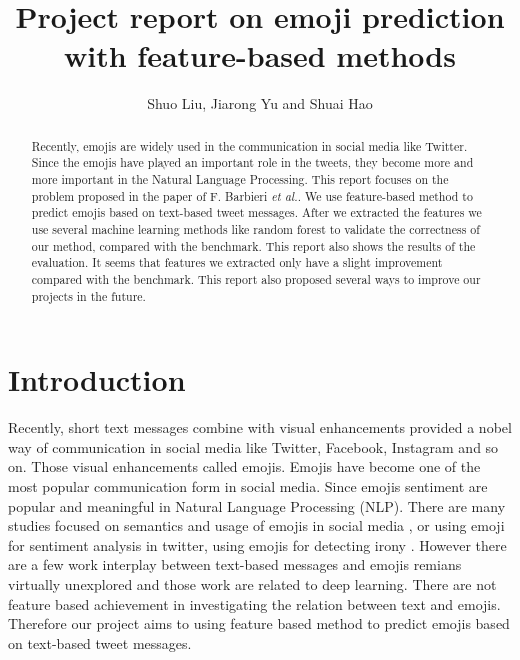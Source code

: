 \documentclass[english, table, latin9]{article}
\title{Project report on emoji prediction with feature-based methods}
\author{Shuo Liu, Jiarong Yu and Shuai Hao}
\date{}
\begin{document}
\maketitle
\begin{abstract}
Recently, emojis are widely used in the communication in social media like Twitter. Since the emojis have played an important role in the tweets, they become more and more important in the Natural Language Processing. This report focuses on the problem proposed in the paper of F. Barbieri \emph{et al.}\cite{bib4}. We use feature-based method to predict emojis based on text-based tweet messages. After we extracted the features we use several machine learning methods like random forest to validate the correctness of our method, compared with the benchmark. This report also shows the results of the evaluation. It seems that features we extracted only have a slight improvement compared with the benchmark. This report also proposed several ways to improve our projects in the future.

\end{abstract}


\section{Introduction}
\label{sc1}
Recently, short text messages combine with visual enhancements provided a nobel way of communication in social media like Twitter, Facebook, Instagram and so on. Those visual enhancements called emojis. Emojis have become one of the most popular communication form in social media.  Since emojis sentiment are popular and meaningful\cite{bib13} in Natural Language Processing (NLP). There are many studies focused on semantics and usage of emojis in social media \cite{bib6, bib7, bib8, bib9, bib10, bib11}, or using emoji for sentiment analysis in twitter, using emojis for detecting irony \cite{bib12}. However there are a few work interplay between text-based messages and emojis remians virtually unexplored and those work are related to deep learning. There are not feature based achievement in investigating the relation between text and emojis. Therefore our project aims to using feature based method to predict emojis based on text-based tweet messages.
\end{document}

